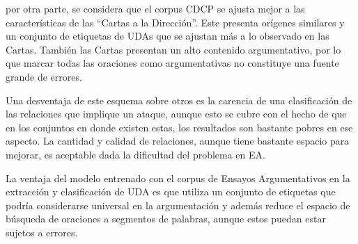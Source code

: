 \documentclass[a4paper,11pt,twocolumn,twoside]{article}
\begin{document}
\begin{table}[h]
	\begin{center}
		\caption{\label{table:comparative_test_abstrct_f1_metrics_segmenter}Métricas comparativas del corpus AbsTRCT.}
	\end{center}
\end{table}


por otra parte, se considera que el corpus CDCP se ajusta mejor a las características de las ``Cartas 
a la Dirección''. Este presenta orígenes similares y un conjunto de etiquetas de UDAs que se ajustan más a lo observado 
en las Cartas. También las Cartas presentan un alto contenido argumentativo, por lo que marcar 
todas las oraciones como argumentativas no constituye una fuente grande de errores.

Una desventaja de este esquema sobre otros es la carencia de una 
clasificación de las relaciones que implique un ataque, aunque esto se cubre con el hecho de 
que en los conjuntos en donde existen estas, los resultados son bastante pobres en ese aspecto. La cantidad 
y calidad de relaciones, aunque tiene bastante espacio para mejorar, es aceptable dada la dificultad 
del problema en EA.

La ventaja del modelo entrenado con el corpus de Ensayos Argumentativos en la extracción 
y clasificación de UDA es que utiliza un conjunto de etiquetas que 
podría considerarse universal en la argumentación y además reduce el espacio de búsqueda de 
oraciones a segmentos de palabras, aunque estos puedan estar sujetos a errores. 
\end{document}
